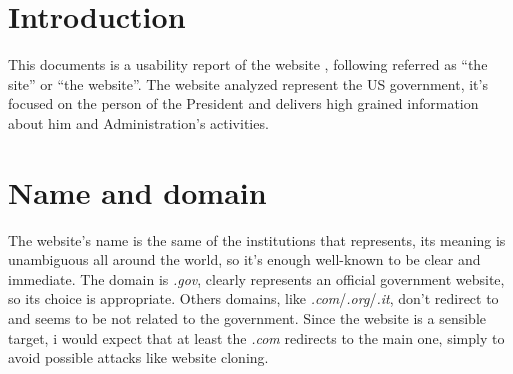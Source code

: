 \documentclass[
10pt, %
a4paper, %
oneside, %
headinclude,footinclude, %
BCOR5mm, %
]{scrartcl}
\begin{document}


{\let\thefootnote\relax{}}


\newpage %


\section{Introduction}
	This documents is a usability report of the website \thesite{}, following referred as ``the site'' or ``the website''. The website analyzed represent the US government, it's focused on the person of the President and delivers high grained information about him and Administration's activities.  
 

\section{Name and domain}

The website's name is the same of the institutions that represents, its meaning is unambiguous all around the world, so it's enough well-known to be clear and immediate. The domain is \emph{.gov}, clearly represents an official government website, so its choice is appropriate. Others domains, like \emph{.com}/\emph{.org}/\emph{.it}, don't redirect to \thesite{} and seems to be not related to the government. Since the website is a sensible target, i would expect that at least the \emph{.com} redirects to the main one, simply to avoid possible attacks like website cloning.
\end{document}
